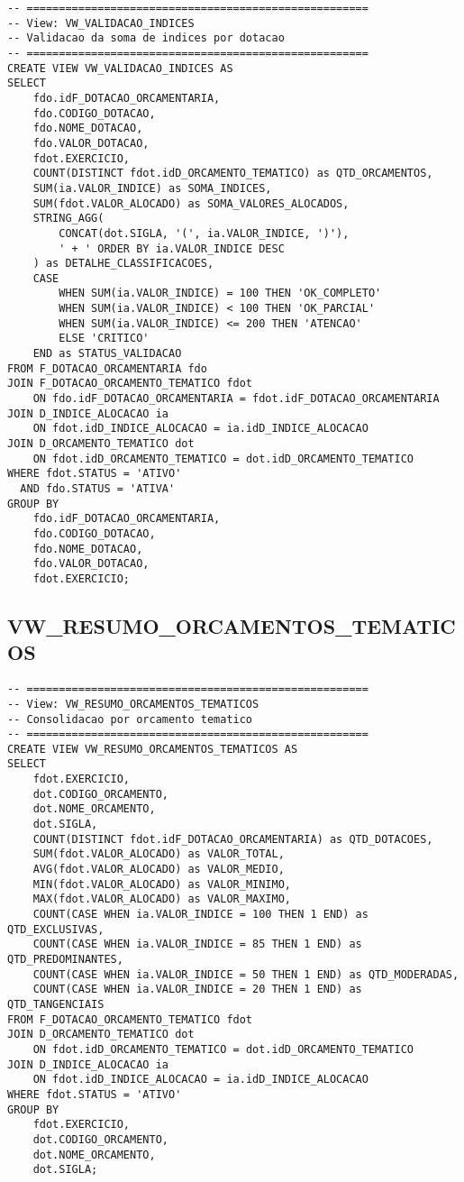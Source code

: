 \documentclass[12pt,a4paper]{article}
\begin{document}
\begin{lstlisting}
-- =====================================================
-- View: VW_VALIDACAO_INDICES
-- Validacao da soma de indices por dotacao
-- =====================================================
CREATE VIEW VW_VALIDACAO_INDICES AS
SELECT 
    fdo.idF_DOTACAO_ORCAMENTARIA,
    fdo.CODIGO_DOTACAO,
    fdo.NOME_DOTACAO,
    fdo.VALOR_DOTACAO,
    fdot.EXERCICIO,
    COUNT(DISTINCT fdot.idD_ORCAMENTO_TEMATICO) as QTD_ORCAMENTOS,
    SUM(ia.VALOR_INDICE) as SOMA_INDICES,
    SUM(fdot.VALOR_ALOCADO) as SOMA_VALORES_ALOCADOS,
    STRING_AGG(
        CONCAT(dot.SIGLA, '(', ia.VALOR_INDICE, ')'), 
        ' + ' ORDER BY ia.VALOR_INDICE DESC
    ) as DETALHE_CLASSIFICACOES,
    CASE 
        WHEN SUM(ia.VALOR_INDICE) = 100 THEN 'OK_COMPLETO'
        WHEN SUM(ia.VALOR_INDICE) < 100 THEN 'OK_PARCIAL'
        WHEN SUM(ia.VALOR_INDICE) <= 200 THEN 'ATENCAO'
        ELSE 'CRITICO'
    END as STATUS_VALIDACAO
FROM F_DOTACAO_ORCAMENTARIA fdo
JOIN F_DOTACAO_ORCAMENTO_TEMATICO fdot
    ON fdo.idF_DOTACAO_ORCAMENTARIA = fdot.idF_DOTACAO_ORCAMENTARIA
JOIN D_INDICE_ALOCACAO ia
    ON fdot.idD_INDICE_ALOCACAO = ia.idD_INDICE_ALOCACAO
JOIN D_ORCAMENTO_TEMATICO dot
    ON fdot.idD_ORCAMENTO_TEMATICO = dot.idD_ORCAMENTO_TEMATICO
WHERE fdot.STATUS = 'ATIVO'
  AND fdo.STATUS = 'ATIVA'
GROUP BY 
    fdo.idF_DOTACAO_ORCAMENTARIA,
    fdo.CODIGO_DOTACAO,
    fdo.NOME_DOTACAO,
    fdo.VALOR_DOTACAO,
    fdot.EXERCICIO;
\end{lstlisting}

\subsection{VW\_RESUMO\_ORCAMENTOS\_TEMATICOS}

\begin{lstlisting}
-- =====================================================
-- View: VW_RESUMO_ORCAMENTOS_TEMATICOS
-- Consolidacao por orcamento tematico
-- =====================================================
CREATE VIEW VW_RESUMO_ORCAMENTOS_TEMATICOS AS
SELECT 
    fdot.EXERCICIO,
    dot.CODIGO_ORCAMENTO,
    dot.NOME_ORCAMENTO,
    dot.SIGLA,
    COUNT(DISTINCT fdot.idF_DOTACAO_ORCAMENTARIA) as QTD_DOTACOES,
    SUM(fdot.VALOR_ALOCADO) as VALOR_TOTAL,
    AVG(fdot.VALOR_ALOCADO) as VALOR_MEDIO,
    MIN(fdot.VALOR_ALOCADO) as VALOR_MINIMO,
    MAX(fdot.VALOR_ALOCADO) as VALOR_MAXIMO,
    COUNT(CASE WHEN ia.VALOR_INDICE = 100 THEN 1 END) as QTD_EXCLUSIVAS,
    COUNT(CASE WHEN ia.VALOR_INDICE = 85 THEN 1 END) as QTD_PREDOMINANTES,
    COUNT(CASE WHEN ia.VALOR_INDICE = 50 THEN 1 END) as QTD_MODERADAS,
    COUNT(CASE WHEN ia.VALOR_INDICE = 20 THEN 1 END) as QTD_TANGENCIAIS
FROM F_DOTACAO_ORCAMENTO_TEMATICO fdot
JOIN D_ORCAMENTO_TEMATICO dot
    ON fdot.idD_ORCAMENTO_TEMATICO = dot.idD_ORCAMENTO_TEMATICO
JOIN D_INDICE_ALOCACAO ia
    ON fdot.idD_INDICE_ALOCACAO = ia.idD_INDICE_ALOCACAO
WHERE fdot.STATUS = 'ATIVO'
GROUP BY 
    fdot.EXERCICIO,
    dot.CODIGO_ORCAMENTO,
    dot.NOME_ORCAMENTO,
    dot.SIGLA;
\end{lstlisting}
\end{document}
